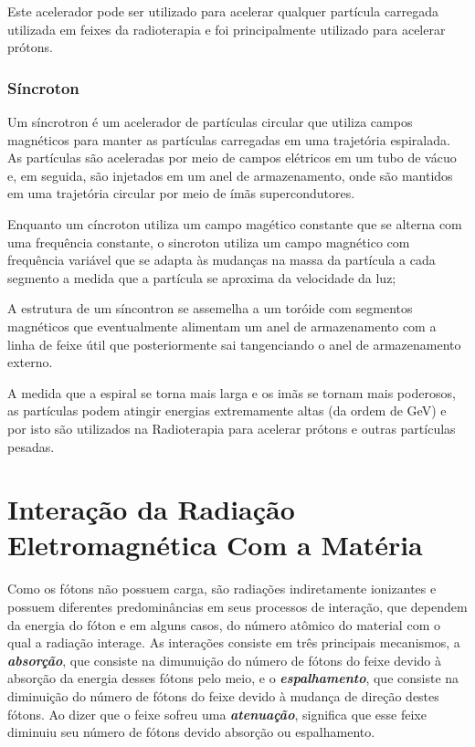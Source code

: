 \documentclass[11pt,a4paper]{article}
\begin{document}
                Este acelerador pode ser utilizado para acelerar qualquer partícula carregada utilizada em feixes da radioterapia e foi principalmente utilizado para acelerar prótons. 

            \subsubsection{Síncroton}

                Um síncrotron é um acelerador de partículas circular que utiliza campos magnéticos para manter as partículas carregadas em uma trajetória espiralada. As partículas são aceleradas por meio de campos elétricos em um tubo de vácuo e, em seguida, são injetados em um anel de armazenamento, onde são mantidos em uma trajetória circular por meio de ímãs supercondutores.

                Enquanto um cíncroton utiliza um campo magético constante que se alterna com uma frequência constante, o sincroton utiliza um campo magnético com frequência variável que se adapta às mudanças na massa da partícula a cada segmento a medida que a partícula se aproxima da velocidade da luz;

                A estrutura de um síncontron se assemelha a um toróide com segmentos magnéticos que eventualmente alimentam um anel de armazenamento com a linha de feixe útil que posteriormente sai tangenciando o anel de armazenamento externo. 

                A medida que a espiral se torna mais larga e os imãs se tornam mais poderosos, as partículas podem atingir energias extremamente altas (da ordem de GeV) e por isto são utilizados na Radioterapia para acelerar prótons e outras partículas pesadas. 
                
    \section{Interação da Radiação Eletromagnética Com a Matéria}

        Como os fótons não possuem carga, são radiações indiretamente ionizantes e possuem diferentes predominâncias em seus processos de interação, que dependem da energia do fóton e em alguns casos, do número atômico do material com o qual a radiação interage. As interações consiste em três principais mecanismos, a \textbf{\textit{\textcolor{CarnationPink}{absorção}}}, que consiste na dimunuição do número de fótons do feixe devido à absorção da energia desses fótons pelo meio, e o \textbf{\textit{\textcolor{CarnationPink}{espalhamento}}}, que consiste na diminuição do número de fótons do feixe devido à mudança de direção destes fótons. Ao dizer que o feixe sofreu uma \textbf{\textit{\textcolor{CarnationPink}{atenuação}}}, significa que esse feixe diminuiu seu número de fótons devido absorção ou espalhamento.
\end{document}
